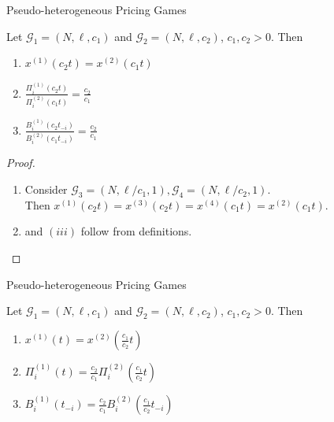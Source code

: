 \documentclass[handout]{beamer}
\newcommand{\Gm}{\mathcal{G}}
\begin{document}
\begin{frame}{Pseudo-heterogeneous Pricing Games}
\begin{lemma}
	Let $\Gm_1 = (N, \ell, c_1)$ and $\Gm_2 = (N, \ell, c_2)$, $c_1, c_2 > 0$.
	Then
	\begin{enumerate}[$(i)$]
		\item $x^{(1)}(c_2 t) = x^{(2)}(c_1 t)$
		\item $\frac{\Pi_i^{(1)}(c_2 t)}{\Pi_i^{(2)}(c_1 t)} = \frac{c_2}{c_1}$
		\item $\frac{B_i^{(1)}(c_2t_{-i})}{B_i^{(2)}(c_1 t_{-i})} = \frac{c_2}{c_1}$
	\end{enumerate}
\end{lemma}
\begin{proof}
	\begin{enumerate}[$(i)$]
		\item Consider $\Gm_3 = (N, \ell/c_1, 1), \Gm_4 = (N, \ell/c_2, 1)$.\\
		Then $x^{(1)}(c_2 t) = x^{(3)}(c_2 t) = x^{(4)}(c_1 t) = x^{(2)}(c_1 t)$.
		\item and $(iii)$ follow from definitions.
		\vspace{-20pt}
	\end{enumerate}
\end{proof}
\end{frame}

\begin{frame}{Pseudo-heterogeneous Pricing Games}
	\begin{lemma}
		Let $\Gm_1 = (N, \ell, c_1)$ and $\Gm_2 = (N, \ell, c_2)$, $c_1, c_2 > 0$.
		Then
		\begin{enumerate}[$(i)$]
			\item $x^{(1)}(t) = x^{(2)}\left(\frac{c_1}{c_2} t\right)$
			\item $\Pi_i^{(1)}(t) = \frac{c_2}{c_1} \Pi_i^{(2)}\left(\frac{c_1}{c_2} t\right)$
			\item $B_i^{(1)}(t_{-i}) = \frac{c_2}{c_1} B_i^{(2)}\left(\frac{c_1}{c_2} t_{-i}\right)$
		\end{enumerate}
	\end{lemma}
\end{frame}
\end{document}
